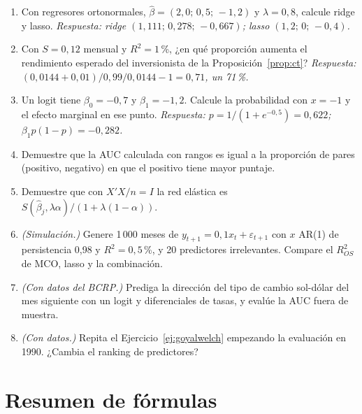 \begin{enumerate}[label=\textbf{\thechapter.\arabic*},leftmargin=*,itemsep=6pt]
  \item Con regresores ortonormales, $\hat\beta=(2{,}0;\,0{,}5;\,-1{,}2)$ y $\lambda=0{,}8$, calcule ridge y lasso. \textit{Respuesta: ridge
  $(1{,}111;\,0{,}278;\,-0{,}667)$; lasso $(1{,}2;\,0;\,-0{,}4)$.}

  \item Con $S=0{,}12$ mensual y $R^2=1$\,\%, ¿en qué proporción aumenta el rendimiento esperado del inversionista de la Proposición~\ref{prop:ct}?
  \textit{Respuesta: $(0{,}0144+0{,}01)/0{,}99/0{,}0144-1=0{,}71$, un 71\,\%.}

  \item Un logit tiene $\beta_0=-0{,}7$ y $\beta_1=-1{,}2$. Calcule la probabilidad con $x=-1$ y el efecto marginal en ese punto.
  \textit{Respuesta: $p=1/(1+e^{-0{,}5})=0{,}622$; $\beta_1p(1-p)=-0{,}282$.}

  \item Demuestre que la AUC calculada con rangos es igual a la proporción de pares (positivo, negativo) en que el positivo tiene mayor puntaje.

  \item Demuestre que con $X'X/n=I$ la red elástica es $S(\hat\beta_j,\lambda\alpha)/(1+\lambda(1-\alpha))$.

  \item \emph{(Simulación.)} Genere 1\,000 meses de $y_{t+1}=0{,}1x_t+\varepsilon_{t+1}$ con $x$ AR(1) de persistencia 0,98 y $R^2=0{,}5$\,\%, y 20 predictores
  irrelevantes. Compare el $R^2_{OS}$ de MCO, lasso y la combinación.

  \item \emph{(Con datos del BCRP.)} Prediga la dirección del tipo de cambio sol-dólar del mes siguiente con un logit y diferenciales de tasas,
  y evalúe la AUC fuera de muestra.

  \item \emph{(Con datos.)} Repita el Ejercicio~\ref{ej:goyalwelch} empezando la evaluación en 1990. ¿Cambia el ranking de predictores?
\end{enumerate}

\section{Resumen de fórmulas}

